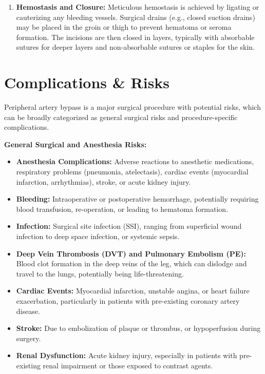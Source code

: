 \begin{enumerate}
  \item \textbf{Hemostasis and Closure:} Meticulous hemostasis is achieved by ligating or cauterizing any bleeding vessels. Surgical drains (e.g., closed suction drains) may be placed in the groin or thigh to prevent hematoma or seroma formation. The incisions are then closed in layers, typically with absorbable sutures for deeper layers and non-absorbable sutures or staples for the skin.
\end{enumerate}

\section*{Complications \& Risks}
Peripheral artery bypass is a major surgical procedure with potential risks, which can be broadly categorized as general surgical risks and procedure-specific complications.

\textbf{General Surgical and Anesthesia Risks:}
\begin{itemize}
  \item \textbf{Anesthesia Complications:} Adverse reactions to anesthetic medications, respiratory problems (pneumonia, atelectasis), cardiac events (myocardial infarction, arrhythmias), stroke, or acute kidney injury.
  
  \item \textbf{Bleeding:} Intraoperative or postoperative hemorrhage, potentially requiring blood transfusion, re-operation, or leading to hematoma formation.
  
  \item \textbf{Infection:} Surgical site infection (SSI), ranging from superficial wound infection to deep space infection, or systemic sepsis.
  
  \item \textbf{Deep Vein Thrombosis (DVT) and Pulmonary Embolism (PE):} Blood clot formation in the deep veins of the leg, which can dislodge and travel to the lungs, potentially being life-threatening.
  
  \item \textbf{Cardiac Events:} Myocardial infarction, unstable angina, or heart failure exacerbation, particularly in patients with pre-existing coronary artery disease.
  
  \item \textbf{Stroke:} Due to embolization of plaque or thrombus, or hypoperfusion during surgery.
  
  \item \textbf{Renal Dysfunction:} Acute kidney injury, especially in patients with pre-existing renal impairment or those exposed to contrast agents.
\end{itemize}

